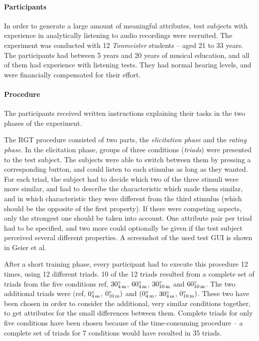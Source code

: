 \paragraph{Participants}
In order to generate a large amount of meaningful attributes, test subjects with
experience in analytically listening to audio recordings were recruited.  The
experiment was conducted with 12 \emph{Tonmeister} students -- aged 21 to 33
years. The participants had between 5 years and 20 years
of musical education, and all of them had experience with listening
tests. They had normal hearing levels, and were financially compensated for
their effort.


\paragraph{Procedure}
The participants received written instructions explaining their tasks in the two
phases of the experiment.

The \ac{RGT} procedure consisted of two parts, the \emph{elicitation phase} and
the \emph{rating phase}. In the elicitation phase, groups of three conditions
(\emph{triads}) were presented to the test subject. The subjects were able to
switch between them by pressing a corresponding button, and could listen to each
stimulus as long as they wanted.  For each triad, the subject had to decide
which two of the three stimuli were more similar, and had to describe the
characteristic which made them similar, and in which characteristic they were
different from the third stimulus (which should be the opposite of the first
property).  If there were competing aspects, only the strongest one should be
taken into account.  One attribute pair per triad had to be specified, and two
more could optionally be given if the test subject perceived several different
properties. A screenshot of the used test GUI is shown in Geier et
al.\autocite{Geier2010a}

After a short training phase, every participant had to execute this procedure 12
times, using 12 different triads.  10 of the 12 triads resulted from a complete
set of triads from the five conditions ref, $30^\circ_{4\,\text{m}}$,
$60^\circ_{4\,\text{m}}$, $30^\circ_{10\,\text{m}}$ and
$60^\circ_{10\,\text{m}}$.  The
two additional triads were $($ref, $0^\circ_{4\,\text{m}}$,
$0^\circ_{10\,\text{m}})$
and $(0^\circ_{4\,\text{m}}$, $30^\circ_{4\,\text{m}}$,
$0^\circ_{10\,\text{m}})$.  These
two have been chosen in order to consider the additional, very similar
conditions together, to get attributes for the small differences between them.
Complete triads for only five conditions have been chosen because of the
time-consuming procedure -- a complete set of triads for 7 conditions would have
resulted in 35 triads.

